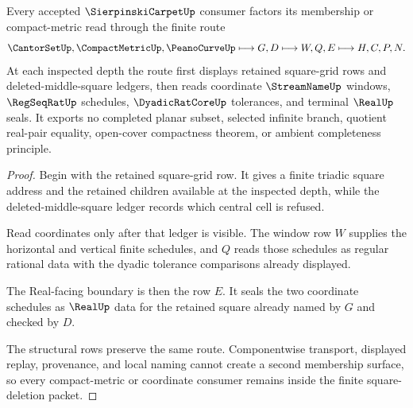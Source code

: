 \begin{theorem}
\label{thm:sierpinski-carpet-finite-square-deletion-route}
Every accepted $\SierpinskiCarpetUp$ consumer factors its membership or compact-metric read through the finite route
$$
\CantorSetUp,\CompactMetricUp,\PeanoCurveUp \longmapsto G,D \longmapsto W,Q,E \longmapsto H,C,P,N .
$$
At each inspected depth the route first displays retained square-grid rows and deleted-middle-square ledgers, then reads coordinate $\StreamNameUp$ windows, $\RegSeqRatUp$ schedules, $\DyadicRatCoreUp$ tolerances, and terminal $\RealUp$ seals. It exports no completed planar subset, selected infinite branch, quotient real-pair equality, open-cover compactness theorem, or ambient completeness principle.
\end{theorem}
\begin{proof}
Begin with the retained square-grid row. It gives a finite triadic square address and the retained children available at the inspected depth, while the deleted-middle-square ledger records which central cell is refused.

Read coordinates only after that ledger is visible. The window row $W$ supplies the horizontal and vertical finite schedules, and $Q$ reads those schedules as regular rational data with the dyadic tolerance comparisons already displayed.

The Real-facing boundary is then the row $E$. It seals the two coordinate schedules as $\RealUp$ data for the retained square already named by $G$ and checked by $D$.

The structural rows preserve the same route. Componentwise transport, displayed replay, provenance, and local naming cannot create a second membership surface, so every compact-metric or coordinate consumer remains inside the finite square-deletion packet.
\end{proof}


